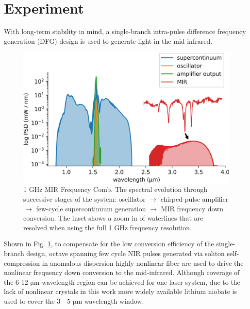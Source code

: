 \documentclass{optica-article}
\begin{document}


\section{Experiment}


With long-term stability in mind, a single-branch intra-pulse difference frequency generation (DFG) design is used to generate light in the mid-infrared. 

\begin{figure}[h]
    \centering
    \includegraphics[width=\linewidth]{spectrum_in_setup.png}
    \caption{1 GHz MIR Frequency Comb. The spectral evolution through successive stages of the system: oscillator $\rightarrow$ chirped-pulse amplifier $\rightarrow$ few-cycle supercontinuum generation $\rightarrow$ MIR frequency down conversion. The inset shows a zoom in of waterlines that are resolved when using the full 1 GHz frequency resolution.}
    \label{fig:spectrum_in_setup}
\end{figure}

Shown in Fig. \ref{fig:spectrum_in_setup}, to compensate for the low conversion efficiency of the single-branch design, octave spanning few cycle NIR pulses generated via soliton self-compression in anomalous dispersion highly nonlinear fiber are used to drive the nonlinear frequency down conversion to the mid-infrared. Although coverage of the 6-12 $\mathrm{\mu m}$ wavelength region can be achieved for one laser system, due to the lack of nonlinear crystals in this work more widely available lithium niobate is used to cover the 3 - 5 $\mathrm{\mu m}$ wavelength window.
\end{document}

